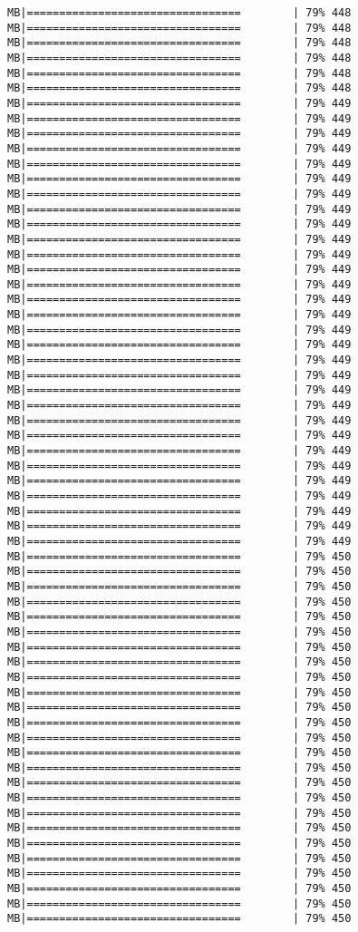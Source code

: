 \documentclass[
]{article}
\begin{document}
\begin{verbatim}
MB|=================================        | 79% 448 MB|=================================        | 79% 448 MB|=================================        | 79% 448 MB|=================================        | 79% 448 MB|=================================        | 79% 448 MB|=================================        | 79% 448 MB|=================================        | 79% 449 MB|=================================        | 79% 449 MB|=================================        | 79% 449 MB|=================================        | 79% 449 MB|=================================        | 79% 449 MB|=================================        | 79% 449 MB|=================================        | 79% 449 MB|=================================        | 79% 449 MB|=================================        | 79% 449 MB|=================================        | 79% 449 MB|=================================        | 79% 449 MB|=================================        | 79% 449 MB|=================================        | 79% 449 MB|=================================        | 79% 449 MB|=================================        | 79% 449 MB|=================================        | 79% 449 MB|=================================        | 79% 449 MB|=================================        | 79% 449 MB|=================================        | 79% 449 MB|=================================        | 79% 449 MB|=================================        | 79% 449 MB|=================================        | 79% 449 MB|=================================        | 79% 449 MB|=================================        | 79% 449 MB|=================================        | 79% 449 MB|=================================        | 79% 449 MB|=================================        | 79% 449 MB|=================================        | 79% 449 MB|=================================        | 79% 449 MB|=================================        | 79% 449 MB|=================================        | 79% 450 MB|=================================        | 79% 450 MB|=================================        | 79% 450 MB|=================================        | 79% 450 MB|=================================        | 79% 450 MB|=================================        | 79% 450 MB|=================================        | 79% 450 MB|=================================        | 79% 450 MB|=================================        | 79% 450 MB|=================================        | 79% 450 MB|=================================        | 79% 450 MB|=================================        | 79% 450 MB|=================================        | 79% 450 MB|=================================        | 79% 450 MB|=================================        | 79% 450 MB|=================================        | 79% 450 MB|=================================        | 79% 450 MB|=================================        | 79% 450 MB|=================================        | 79% 450 MB|=================================        | 79% 450 MB|=================================        | 79% 450 MB|=================================        | 79% 450 MB|=================================        | 79% 450 MB|=================================        | 79% 450 MB|=================================        | 79% 450 
\end{verbatim}
\end{document}
